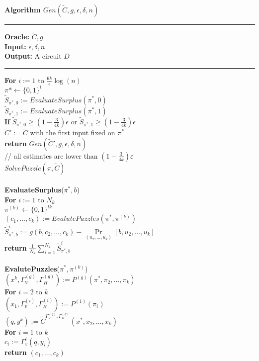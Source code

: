 \begin{codeblock}
  \textbf{Algorithm $Gen(\widetilde{C},g,\epsilon,\delta,n)$}
  \medskip

  \hrule

  \medskip

  \textbf{Oracle:} $\widetilde{C}, g$ \\
  \textbf{Input:}  $\epsilon, \delta, n$\\
  \textbf{Output:} A circuit $D$

  \medskip\hrule\medskip

  \textbf{For} $i:=1$ to $\frac{6k}{\epsilon}\log(n)$ \\
  \IndI $\pi* \leftarrow \{0,1\}^{l}$\\
  \IndI $\widetilde{S}_{\pi^*,0} := EvaluateSurplus(\pi^*, 0)$\\
  \IndI $\widetilde{S}_{\pi^*,1} := EvaluateSurplus(\pi^*, 1)$\\
  \IndI \textbf{If} $\widetilde{S}_{\pi^*,0} \geq (1 - \frac{3}{4k}) \epsilon$ or $\widetilde{S}_{\pi^*,1} \geq (1 - \frac{3}{4k}) \epsilon$ \\
  \IndII $\widetilde{C}' := \widetilde{C}$ with the first input fixed on $\pi^*$\\
  \IndII\textbf{return} $Gen(\widetilde{C}', g, \epsilon, \delta, n)$ \\
  // all estimates are lower than $(1-\frac{3}{4k})\varepsilon$\\
  $SolvePuzzle(\pi, \widetilde{C})$ \\
  \\
  \textbf{EvaluateSurplus}($\pi^*, b$) \\
  \IndI \textbf{For} $i:=1$ to $N_k$ \\
  \IndII $\pi^{(k)} \leftarrow \{0,1\}^{lk}$\\
  \IndII $(c_1, \dots, c_k) := EvalutePuzzles(\pi^*, \pi^{(k)})$\\
  \IndII $\widetilde{S}_{\pi^*,b}^i := g(b, c_2, \dots, c_k) - \underset{(u_2, \dots, u_k)}{\Pr}[b, u_2, \dots, u_k] $\\
  \IndI \textbf{return} $\frac{1}{N_k} \sum_{i=1}^{N_k} \widetilde{S}_{\pi^*,b}^i$\\
  \\
  \textbf{EvalutePuzzles}($\pi^*, \pi^{(k)}$)\\
  \IndI $(x^{k}, \Gamma_V^{(g)}, \Gamma_H^{(g)}) := P^{(g)}(\pi^*, \pi_2, \dots, \pi_k)$ \\
  \IndI \textbf{For} $i=2$ to $k$\\
  \IndII $(x_1, \Gamma_v^{(i)}, \Gamma_H^{(i)}) := P^{(1)}(\pi_i)$\\
  \IndI $(q,y^{k}) := \widetilde{C}^{\Gamma_V^{(g)}, \Gamma_H^{(g)}}(x^*, x_2, \dots, x_k)$\\
  \IndI \textbf{For} $i=1$ to $k$\\
  \IndII $c_i := \Gamma_v^{i}(q, y_i)$\\
  \IndI \textbf{return} $(c_1, \dots, c_k)$\\
\end{codeblock}

